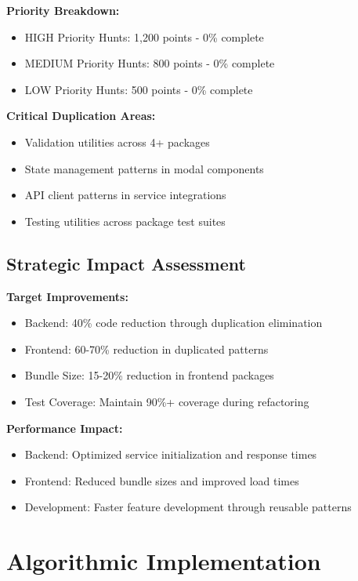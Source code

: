 \documentclass[10pt]{article}
\begin{document}
\textbf{Priority Breakdown:}
\begin{itemize}
    \item HIGH Priority Hunts: 1,200 points - 0\% complete
    \item MEDIUM Priority Hunts: 800 points - 0\% complete
    \item LOW Priority Hunts: 500 points - 0\% complete
\end{itemize}

\textbf{Critical Duplication Areas:}
\begin{itemize}
    \item Validation utilities across 4+ packages
    \item State management patterns in modal components
    \item API client patterns in service integrations
    \item Testing utilities across package test suites
\end{itemize}

\subsection{Strategic Impact Assessment}

\textbf{Target Improvements:}
\begin{itemize}
    \item Backend: 40\% code reduction through duplication elimination
    \item Frontend: 60-70\% reduction in duplicated patterns
    \item Bundle Size: 15-20\% reduction in frontend packages
    \item Test Coverage: Maintain 90\%+ coverage during refactoring
\end{itemize}

\textbf{Performance Impact:}
\begin{itemize}
    \item Backend: Optimized service initialization and response times
    \item Frontend: Reduced bundle sizes and improved load times
    \item Development: Faster feature development through reusable patterns
\end{itemize}

\section{Algorithmic Implementation}
\end{document}
